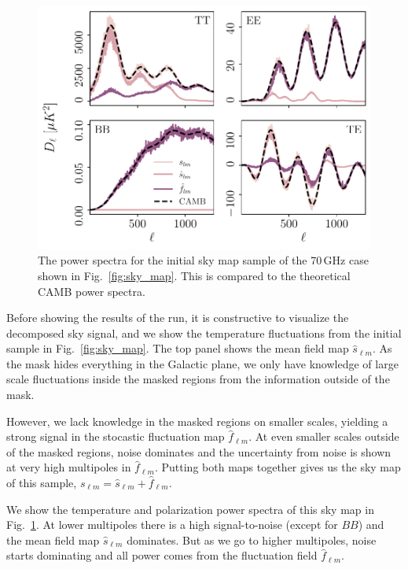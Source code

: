 \documentclass[twocolumn]{../common/aa}
\begin{document}
\begin{figure}
	\centering
	\includegraphics[width=\linewidth]{figures/sigma_ell.pdf}
	\caption{\label{fig:sigma_ell}The power spectra for the initial sky map sample of the 70\,GHz case shown in Fig.~\ref{fig:sky_map}. This is compared to the theoretical CAMB power spectra.}
\end{figure}

Before showing the results of the run, it is constructive to visualize the decomposed sky signal, and we show the temperature fluctuations from the initial sample in Fig.~\ref{fig:sky_map}. The top panel shows the mean field map $\hat{s}_{\ell m}$. As the mask hides everything in the Galactic plane, we only have knowledge of large scale fluctuations inside the masked regions from the information outside of the mask.

However, we lack knowledge in the masked regions on smaller scales, yielding a strong signal in the stocastic fluctuation map $\hat{f}_{\ell m}$. At even smaller scales outside of the masked regions, noise dominates and the uncertainty from noise is shown at very high multipoles in $\hat{f}_{\ell m}$. Putting both maps together gives us the sky map of this sample, $s_{\ell m} = \hat{s}_{\ell m} + \hat{f}_{\ell m}$.

We show the temperature and polarization power spectra of this sky map in Fig.~\ref{fig:sigma_ell}. At lower multipoles there is a high signal-to-noise (except for $BB$) and the mean field map $\hat{s}_{\ell m}$ dominates. But as we go to higher multipoles, noise starts dominating and all power comes from the fluctuation field $\hat{f}_{\ell m}$.
\end{document}
